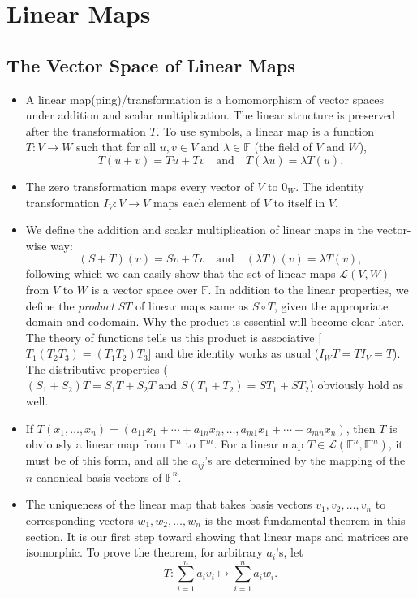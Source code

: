 \documentclass{article}
\newcommand{\F}{\mathbb{F}}
\begin{document}
\begin{itemize}
\end{itemize}

\section{Linear Maps}
\subsection{The Vector Space of Linear Maps}
\begin{itemize}
    \item A linear map(ping)/transformation is a homomorphism of vector spaces under addition and scalar multiplication. The linear structure is preserved after the transformation $T$. To use symbols, a linear map is a function $T: V \rightarrow W$ such that for all $u,v \in V$ and $\lambda \in \F$ (the field of $V$ and $W$),
    \begin{equation*}
        T(u+v) = Tu + Tv \quad \text{and} \quad
        T (\lambda u) = \lambda T(u).
    \end{equation*}
    \item The zero transformation maps every vector of $V$ to $0_W$. The identity transformation $I_V: V \rightarrow V$ maps each element of $V$ to itself in $V$.
    \item We define the addition and scalar multiplication of linear maps in the vector-wise way: $$(S+T)(v) = Sv + Tv \quad \text{and} \quad (\lambda T)(v) = \lambda T(v),$$ following which we can easily show that the set of linear maps $\mathcal{L}(V,W)$ from $V$ to $W$ is a vector space over $\F$. In addition to the linear properties, we define the \textit{product} $ST$ of linear maps same as $S \circ T$, given the appropriate domain and codomain. Why the product is essential will become clear later. The theory of functions tells us this product is associative [$T_1(T_2 T_3) = (T_1 T_2) T_3$] and the identity works as usual ($I_W T = T I_V = T$). The distributive properties ($(S_1 + S_2) T = S_1 T + S_2 T \text{ and } S(T_1 + T_2) = S T_1 + S T_2$) obviously hold as well.
    \item If $T(x_1,\dots,x_n) = (a_{11}x_1+\cdots+a_{1n}x_n,\dots,a_{m1}x_1+\cdots+a_{mn}x_n)$, then $T$ is obviously a linear map from $\F^n$ to $\F^m$. For a linear map $T \in \mathcal{L}(\F^n,\F^m)$, it must be of this form, and all the $a_{ij}$'s are determined by the mapping of the $n$ canonical basis vectors of $\F^n$.
    \item The uniqueness of the linear map that takes basis vectors $v_1, v_2, \dots, v_n$ to corresponding vectors $w_1, w_2, \dots, w_n$ is the most fundamental theorem in this section. It is our first step toward showing that linear maps and matrices are isomorphic. To prove the theorem, for arbitrary $a_i$'s, let $$T: \sum_{i=1}^n a_i v_i \mapsto \sum_{i=1}^n a_i w_i.$$

\end{itemize}
\end{document}

